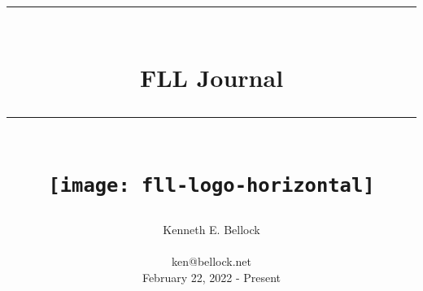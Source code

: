 \documentclass[index=totoc,hyperref, openany]{labbook} %
\date{} %
\newcommand{\HRule}{\rule{\linewidth}{0.5mm}} %
\begin{document}
 

\frontmatter
\title{
	\begin{center}
	  \HRule \\[0.4cm]
	  { \Huge \bfseries FLL Journal}\\[0.4cm]
	  \HRule \\[1.5cm]
                  \texttt{[image: fll-logo-horizontal]}
	\end{center}
}
\author{\Huge Kenneth E. Bellock \\ \\ \LARGE ken@bellock.net \\[1.5cm] February 22, 2022 - Present\\[1.5cm]}
\maketitle

\printindex
\printglossaries
\glsaddall
\tableofcontents

\mainmatter



\end{document}
